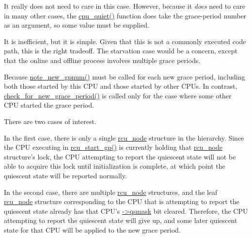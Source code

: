 	It really does not need to care in this case.
	However, because it \emph{does} need to care in many other
	cases, the \url{cpu_quiet()} function does take the
	grace-period number as an argument, so some value must be
	supplied.


	It is inefficient, but it is simple.
	Given that this is not a commonly executed code path, this
	is the right tradeoff.
	The starvation case would be a concern, except that the
	online and offline process involves multiple grace periods.


	Because \url{note_new_gpnum()} must be called for each new
	grace period, including both those started by this CPU and
	those started by other CPUs.
	In contrast, \url{check_for_new_grace_period()} is called only
	for the case where some other CPU started the grace period.


	There are two cases of interest.

	In the first case, there is only a single \url{rcu_node}
	structure in the hierarchy.
	Since the CPU executing in \url{rcu_start_gp()} is currently
	holding that \url{rcu_node} structure's lock, the CPU
	attempting to report the quiescent state will not be able
	to acquire this lock until initialization is complete,
	at which point the quiescent state will be reported
	normally.

	In the second case, there are multiple \url{rcu_node} structures,
	and the leaf \url{rcu_node} structure corresponding to the
	CPU that is attempting to report the quiescent state already
	has that CPU's \url{->qsmask} bit cleared.
	Therefore, the CPU attempting to report the quiescent state
	will give up, and some later quiescent state for that CPU
	will be applied to the new grace period.

